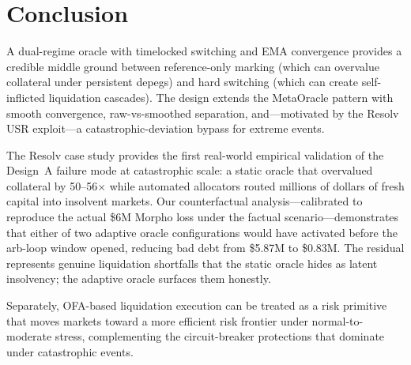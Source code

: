 \documentclass[11pt]{article}
\begin{document}
\section{Conclusion}

A dual-regime oracle with timelocked switching and EMA convergence provides a credible middle ground between reference-only marking (which can overvalue collateral under persistent depegs) and hard switching (which can create self-inflicted liquidation cascades). The design extends the MetaOracle pattern with smooth convergence, raw-vs-smoothed separation, and---motivated by the Resolv USR exploit---a catastrophic-deviation bypass for extreme events.

The Resolv case study provides the first real-world empirical validation of the Design~A failure mode at catastrophic scale: a static oracle that overvalued collateral by 50--56$\times$ while automated allocators routed millions of dollars of fresh capital into insolvent markets. Our counterfactual analysis---calibrated to reproduce the actual \$6M Morpho loss under the factual scenario---demonstrates that either of two adaptive oracle configurations would have activated before the arb-loop window opened, reducing bad debt from \$5.87M to \$0.83M. The residual represents genuine liquidation shortfalls that the static oracle hides as latent insolvency; the adaptive oracle surfaces them honestly.

Separately, OFA-based liquidation execution can be treated as a risk primitive that moves markets toward a more efficient risk frontier under normal-to-moderate stress, complementing the circuit-breaker protections that dominate under catastrophic events.
\end{document}
